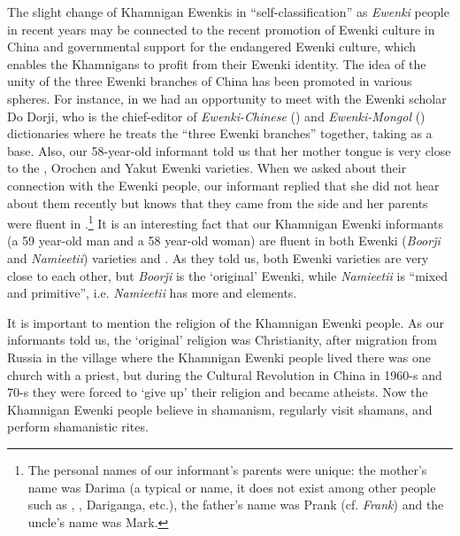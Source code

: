 \documentclass[output=paper,colorlinks,citecolor=brown]{langscibook}
\begin{document}
The slight change of Khamnigan Ewenkis in “self-classification” as \textit{Ewenki} people in recent years may be connected to the recent promotion of Ewenki culture in China and governmental support for the endangered Ewenki culture, which enables the Khamnigans to profit from their Ewenki identity. The idea of the unity of the three Ewenki branches of China has been promoted in various spheres. For instance, in  we had an opportunity to meet with the  Ewenki scholar Do Dorji, who is the chief-editor of \textit{Ewenki-Chinese} (\citeyear{Dorji1998}) and \textit{Ewenki-Mongol} (\citeyear{Dorji2013}) dictionaries where he treats the “three Ewenki branches” together, taking  as a base. Also, our 58-year-old informant told us that her mother tongue is very close to the , Orochen and Yakut Ewenki varieties. When we asked about their connection with the  Ewenki people, our informant replied that she did not hear about them recently but knows that they came from the  side and her parents were fluent in .\footnote{The personal names of our informant’s parents were unique: the mother’s name was Darima (a typical  or  name, it does not exist among other  people such as , , Dariganga, etc.), the father’s name was Prank (cf.  \textit{Frank}) and the uncle’s name was Mark.} It is an interesting fact that our Khamnigan Ewenki informants (a 59 year-old man and a 58 year-old woman) are fluent in both Ewenki (\textit{Boorǰi} and \textit{Namieetii}) varieties and . As they told us, both Ewenki varieties are very close to each other, but \textit{Boorǰi} is the ‘original’ Ewenki, while \textit{Namieetii} is “mixed and primitive”, i.e. \textit{Namieetii} has more  and  elements.

It is important to mention the religion of the Khamnigan Ewenki people. As our informants told us, the ‘original’ religion was Christianity, after migration from Russia in the village where the Khamnigan Ewenki people lived there was one church with a priest, but during the Cultural Revolution in China in 1960-s and 70-s they were forced to ‘give up’ their religion and became atheists. Now the Khamnigan Ewenki people believe in shamanism, regularly visit shamans, and perform shamanistic rites.
\end{document}
